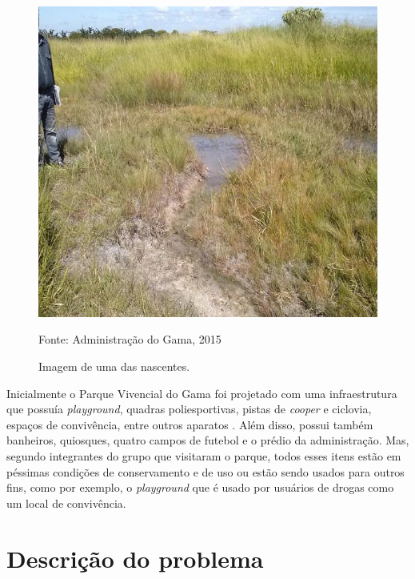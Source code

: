 \begin{figure}[h]
	\centering
	\label{Imagem do Parque Vivencial do Gama}
		\includegraphics[keepaspectratio=true,scale=0.4]{figuras/Nascentes.jpg}
	\caption{Imagem de uma das nascentes.}
	\small{Fonte: Administra\c{c}\~ao do Gama, 2015}
\end{figure}

Inicialmente o Parque Vivencial do Gama foi projetado com uma infraestrutura que possu\'ia \textit{playground}, quadras poliesportivas, pistas de \textit{cooper} e ciclovia, espa\c{c}os de conviv\^encia, entre outros aparatos \cite{Ibram}. Al\'em disso, possui tamb\'em banheiros, quiosques, quatro campos de futebol e o pr\'edio da administra\c{c}\~ao. Mas, segundo integrantes do grupo que visitaram o parque, todos esses itens est\~ao em p\'essimas condi\c{c}\~oes de conservamento e de uso ou est\~ao sendo usados para outros fins, como por exemplo, o \textit{playground} que \'e usado por usu\'arios de drogas como um local de conviv\^encia. 

\section{Descri\c{c}\~ao do problema}

